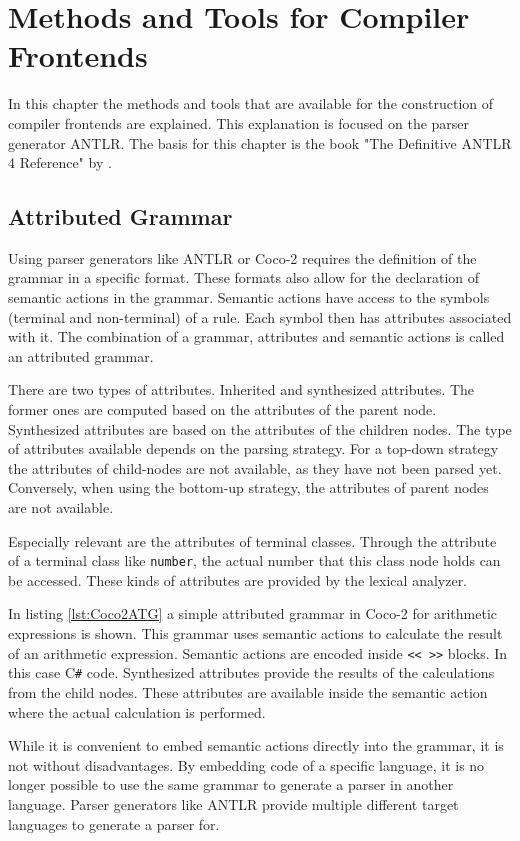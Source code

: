 \chapter{Methods and Tools for Compiler Frontends}

In this chapter the methods and tools that are available for the construction of compiler frontends are explained. This explanation is focused on the parser generator ANTLR. The basis for this chapter is the book "The Definitive ANTLR 4 Reference" by \textcite{Antlr4Reference}.

\section{Attributed Grammar}

Using parser generators like ANTLR or Coco-2 requires the definition of the grammar in a specific format. These formats also allow for the declaration of semantic actions in the grammar. Semantic actions have access to the symbols (terminal and non-terminal) of a rule. Each symbol then has attributes associated with it. The combination of a grammar, attributes and semantic actions is called an attributed grammar.  


There are two types of attributes. Inherited and synthesized attributes. The former ones are computed based on the attributes of the parent node. Synthesized attributes are based on the attributes of the children nodes.  
The type of attributes available depends on the parsing strategy. For a top-down strategy the attributes of child-nodes are not available, as they have not been parsed yet. Conversely, when using the bottom-up strategy, the attributes of parent nodes are not available. 

Especially relevant are the attributes of terminal classes. Through the attribute of a terminal class like \texttt{number}, the actual number that this class node holds can be accessed. These kinds of attributes are provided by the lexical analyzer. 

In listing \ref{lst:Coco2ATG} a simple attributed grammar in Coco-2 for arithmetic expressions is shown. This grammar uses semantic actions to calculate the result of an arithmetic expression. Semantic actions are encoded inside \texttt{<< >>} blocks. In this case C\verb|#| code. Synthesized attributes provide the results of the calculations from the child nodes. These attributes are available inside the semantic action where the actual calculation is performed. 

While it is convenient to embed semantic actions directly into the grammar, it is not without disadvantages. By embedding code of a specific language, it is no longer possible to use the same grammar to generate a parser in another language. Parser generators like ANTLR provide multiple different target languages to generate a parser for. 

